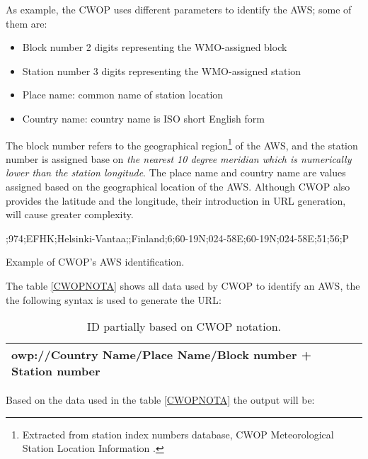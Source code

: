As example, the \gls{CWOP} uses different parameters\cite{CWOPID} to identify the \gls{AWS}; some of them are:

\begin{itemize}

\item Block number 2 digits representing the WMO-assigned block

\item Station number 3 digits representing the WMO-assigned station

\item Place name: common name of station location

\item Country name: country name is \gls{ISO} short English form

\end{itemize}

The block number refers to the geographical region\footnote{Extracted from station index numbers database, \gls{CWOP} Meteorological Station Location Information \cite{CWOPID}.} of the \gls{AWS}, and the station number is assigned base on \emph{the nearest 10 degree meridian which is numerically lower than the station longitude}\cite{CWOPID}. The place name and country name are values assigned based on the geographical location of the \gls{AWS}. Although \gls{CWOP} also provides the latitude and the longitude, their introduction in \gls{URL} generation, will cause greater complexity.

\begin{table}[H]
;974;EFHK;Helsinki-Vantaa;;Finland;6;60-19N;024-58E;60-19N;024-58E;51;56;P
\caption{Example of \protect \gls{CWOP}'s \protect \gls{AWS} identification.}
\label{CWOPNOTA}
\end{table}

The table \ref{CWOPNOTA} shows all data used by \gls{CWOP} to identify an \gls{AWS}, the  the following syntax is used to generate the \gls{URL}:

\begin{table}[H]
\centering
\begin{tabular}{|l|l|l|p{10cm}|}
\hline
\textbf{owp}://Country Name/Place Name/Block number + Station number \\
\hline
\end{tabular}
\caption{ID partially based on \protect \gls{CWOP} notation.}
\label{t6.1}
\end{table}

Based on the data used in the table \ref{CWOPNOTA} the output will be:


